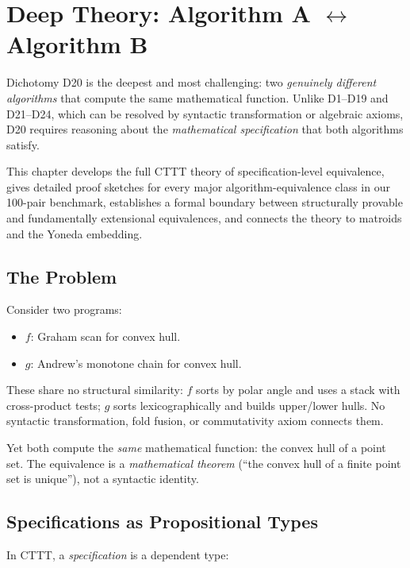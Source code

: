 
\chapter{Deep Theory: Algorithm A $\leftrightarrow$ Algorithm B}
\label{ch:algo-deep}

Dichotomy D20 is the deepest and most challenging: two \emph{genuinely
different algorithms} that compute the same mathematical function.
Unlike D1--D19 and D21--D24, which can be resolved by syntactic
transformation or algebraic axioms, D20 requires reasoning about
the \emph{mathematical specification} that both algorithms satisfy.

This chapter develops the full CTTT theory of specification-level
equivalence, gives detailed proof sketches for every major
algorithm-equivalence class in our 100-pair benchmark, establishes
a formal boundary between structurally provable and fundamentally
extensional equivalences, and connects the theory to matroids and
the Yoneda embedding.

\section{The Problem}

Consider two programs:
\begin{itemize}
  \item $f$: Graham scan for convex hull.
  \item $g$: Andrew's monotone chain for convex hull.
\end{itemize}

These share no structural similarity: $f$ sorts by polar angle and
uses a stack with cross-product tests; $g$ sorts lexicographically
and builds upper/lower hulls.  No syntactic transformation, fold
fusion, or commutativity axiom connects them.

Yet both compute the \emph{same} mathematical function: the convex
hull of a point set.  The equivalence is a \emph{mathematical theorem}
(``the convex hull of a finite point set is unique''), not a
syntactic identity.

\section{Specifications as Propositional Types}

In CTTT, a \emph{specification} is a dependent type:

